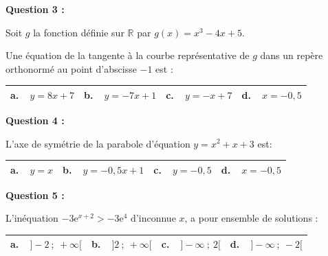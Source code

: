 \documentclass[10pt]{article}
\providecommand{\R}{\mathbb{R}}
\begin{document}
\medskip

\textbf{Question 3 :}

\medskip
Soit $g$ la fonction définie sur $\R$ par $g(x) = x^3 - 4x + 5$.

Une équation de la tangente à la courbe représentative de $g$ dans un repère orthonormé au point d'abscisse $- 1$ est :

\begin{center}
\begin{tabularx}{\linewidth}{|*{4}{X|}}\hline
\textbf{a.~~}$y=8x+7$&\textbf{b.~~}$y=-7 x+1$&\textbf{c.~~}$y= -x +7$&\textbf{d.~~}$x = - 0,5$\\ \hline
\end{tabularx}
\end{center}

\medskip

\textbf{Question 4 :}

\medskip

L'axe de symétrie de la parabole d'équation $y = x^2 + x + 3$ est:

\begin{center}
\begin{tabularx}{\linewidth}{|*{4}{X|}}\hline
\textbf{a.~~}$y =x$&\textbf{b.~~}$y=- 0,5x+1$&\textbf{c.~~}$y= -0,5$&\textbf{d.~~}$x = - 0,5$\\ \hline
\end{tabularx}
\end{center}

\medskip

\textbf{Question 5 :}

\medskip 

L'inéquation $-3\text{e}^{x+2} > - 3\text{e}^{4}$ d'inconnue $x$, a pour ensemble de solutions :

\begin{center}
\begin{tabularx}{\linewidth}{|*{4}{X|}}\hline
\textbf{a.~~}$]- 2~;~+ \infty[$&\textbf{b.~~}$]2~;~+ \infty[$&\textbf{c.~~}$]- \infty~;~2[$&\textbf{d.~~}$]- \infty~;~- 2[$\\ \hline
\end{tabularx}
\end{center}

\bigskip
\end{document}
